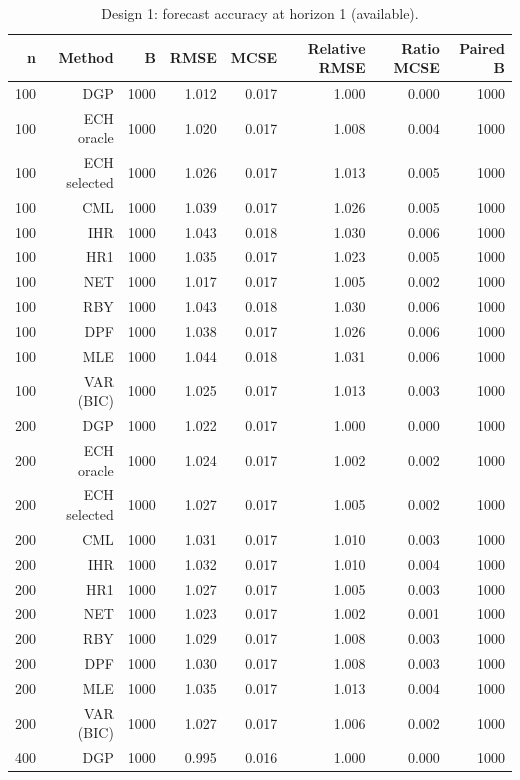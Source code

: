 \begin{table}[p]\centering
\caption{Design 1: forecast accuracy at horizon 1 (available).}
\small
\begin{tabular}{rrrrrrrr}\toprule
n & Method & B & RMSE & MCSE & Relative RMSE & Ratio MCSE & Paired B \\\midrule
100 & DGP & 1000 & 1.012 & 0.017 & 1.000 & 0.000 & 1000 \\
100 & ECH oracle & 1000 & 1.020 & 0.017 & 1.008 & 0.004 & 1000 \\
100 & ECH selected & 1000 & 1.026 & 0.017 & 1.013 & 0.005 & 1000 \\
100 & CML & 1000 & 1.039 & 0.017 & 1.026 & 0.005 & 1000 \\
100 & IHR & 1000 & 1.043 & 0.018 & 1.030 & 0.006 & 1000 \\
100 & HR1 & 1000 & 1.035 & 0.017 & 1.023 & 0.005 & 1000 \\
100 & NET & 1000 & 1.017 & 0.017 & 1.005 & 0.002 & 1000 \\
100 & RBY & 1000 & 1.043 & 0.018 & 1.030 & 0.006 & 1000 \\
100 & DPF & 1000 & 1.038 & 0.017 & 1.026 & 0.006 & 1000 \\
100 & MLE & 1000 & 1.044 & 0.018 & 1.031 & 0.006 & 1000 \\
100 & VAR (BIC) & 1000 & 1.025 & 0.017 & 1.013 & 0.003 & 1000 \\
200 & DGP & 1000 & 1.022 & 0.017 & 1.000 & 0.000 & 1000 \\
200 & ECH oracle & 1000 & 1.024 & 0.017 & 1.002 & 0.002 & 1000 \\
200 & ECH selected & 1000 & 1.027 & 0.017 & 1.005 & 0.002 & 1000 \\
200 & CML & 1000 & 1.031 & 0.017 & 1.010 & 0.003 & 1000 \\
200 & IHR & 1000 & 1.032 & 0.017 & 1.010 & 0.004 & 1000 \\
200 & HR1 & 1000 & 1.027 & 0.017 & 1.005 & 0.003 & 1000 \\
200 & NET & 1000 & 1.023 & 0.017 & 1.002 & 0.001 & 1000 \\
200 & RBY & 1000 & 1.029 & 0.017 & 1.008 & 0.003 & 1000 \\
200 & DPF & 1000 & 1.030 & 0.017 & 1.008 & 0.003 & 1000 \\
200 & MLE & 1000 & 1.035 & 0.017 & 1.013 & 0.004 & 1000 \\
200 & VAR (BIC) & 1000 & 1.027 & 0.017 & 1.006 & 0.002 & 1000 \\
400 & DGP & 1000 & 0.995 & 0.016 & 1.000 & 0.000 & 1000 \\

\end{tabular}
\end{table}
